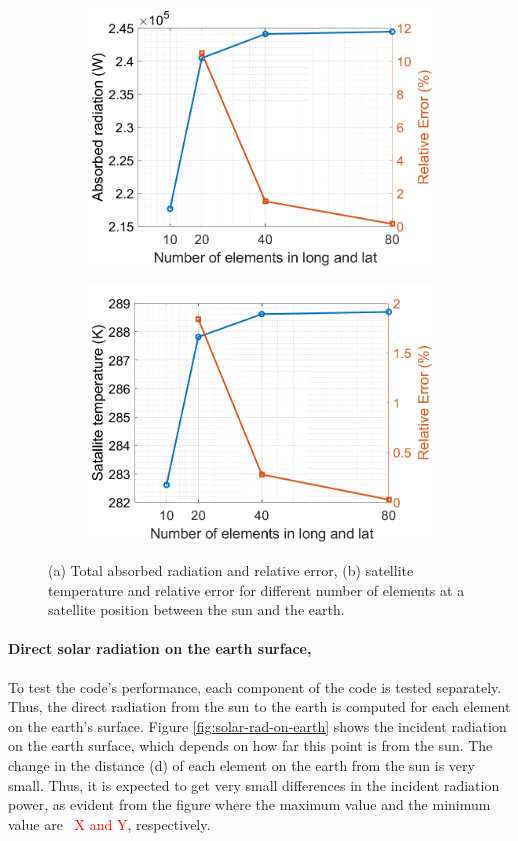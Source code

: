 \documentclass[11pt]{article}
\begin{document}
\begin{figure}[h]
    \centering
    \begin{subfigure}[b]{0.48\textwidth}
        \includegraphics[width = 0.8 \textwidth]{Matlab/Sensitivity/fig_Q_sensitivity_0_180.png}
        \caption{}
        \label{fig:ssa}    
    \end{subfigure}
    \begin{subfigure}[b]{0.48\textwidth}
        \includegraphics[width = 0.8 \textwidth]{Matlab/Sensitivity/fig_temp_sensitivity_0_180.png}
        \caption{}
        \label{fig:ssb}    
    \end{subfigure}
    \caption{(a) Total absorbed radiation and relative error, (b) satellite temperature and relative error for different number of elements at a satellite position between the sun and the earth.}
    \label{fig:ss}
\end{figure}

\paragraph{Direct solar radiation on the earth surface,} To test the code's performance, each component of the code is tested separately. Thus, the direct radiation from the sun to the earth is computed for each element on the earth's surface. Figure \ref{fig:solar-rad-on-earth} shows the incident radiation on the earth surface, which depends on how far this point is from the sun. The change in the distance (d) of each element on the earth from the sun is very small. Thus, it is expected to get very small differences in the incident radiation power, as evident from the figure where the maximum value and the minimum value are~\textcolor{red}{ X and Y}, respectively.
\end{document}
